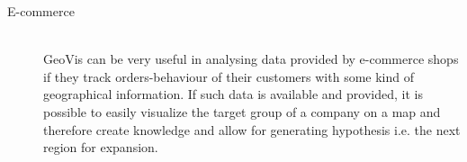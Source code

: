\begin{description}
\item[E-commerce] \hfill \\
\ac{GeoVis} can be very useful in analysing data provided by e-commerce shops if they track orders-behaviour of their customers with some kind of geographical information. If such data is available and provided, it is possible to easily visualize the target group of a company on a map and therefore create knowledge and allow for generating hypothesis i.e. the next region for expansion.

\end{description}